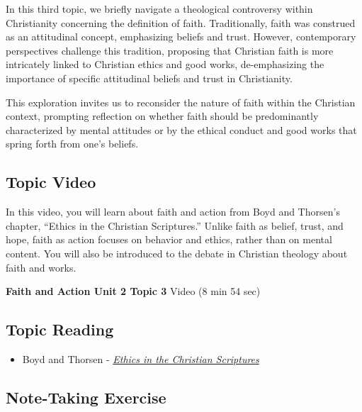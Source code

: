 \documentclass[
]{book}
\providecommand{\tightlist}{%
  \setlength{\itemsep}{0pt}\setlength{\parskip}{0pt}}
\begin{document}
In this third topic, we briefly navigate a theological controversy within Christianity concerning the definition of faith. Traditionally, faith was construed as an attitudinal concept, emphasizing beliefs and trust. However, contemporary perspectives challenge this tradition, proposing that Christian faith is more intricately linked to Christian ethics and good works, de-emphasizing the importance of specific attitudinal beliefs and trust in Christianity.

This exploration invites us to reconsider the nature of faith within the Christian context, prompting reflection on whether faith should be predominantly characterized by mental attitudes or by the ethical conduct and good works that spring forth from one's beliefs.

\hypertarget{topic-video-6}{%
\subsection*{Topic Video}\label{topic-video-6}}

In this video, you will learn about faith and action from Boyd and Thorsen's chapter, ``Ethics in the Christian Scriptures.'' Unlike faith as belief, trust, and hope, faith as action focuses on behavior and ethics, rather than on mental content. You will also be introduced to the debate in Christian theology about faith and works.

\textbf{Faith and Action Unit 2 Topic 3} Video (8 min 54 sec)

\hypertarget{topic-reading-6}{%
\subsection*{Topic Reading}\label{topic-reading-6}}

\begin{itemize}
\tightlist
\item
  Boyd and Thorsen - \href{assets/u2/PHIL-100-Boyd-and-Thorsen-Ethics-in-the-Christian-Scriptures.pdf}{\emph{Ethics in the Christian Scriptures}}
\end{itemize}

\hypertarget{note-taking-exercise-6}{%
\subsection*{Note-Taking Exercise}\label{note-taking-exercise-6}}
\end{document}
